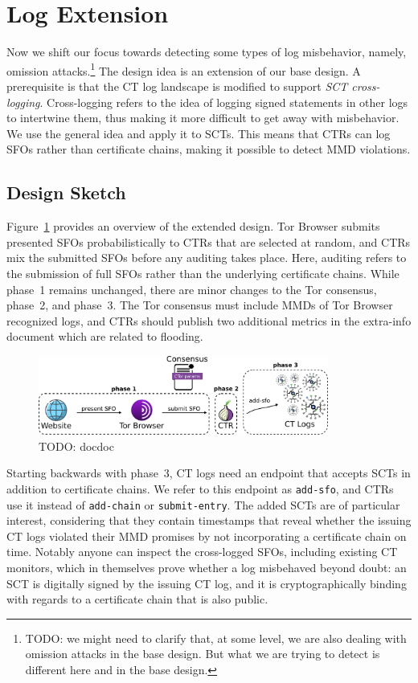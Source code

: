 \section{Log Extension} \label{sec:log}
Now we shift our focus towards detecting some types of log misbehavior, namely,
omission attacks.\footnote{%
	TODO: we might need to clarify that, at some level, we are also dealing with
	omission attacks in the base design.  But what we are trying to detect is
	different here and in the base design.
} The design idea is an
extension of our base design.  A prerequisite is that the CT log landscape
is modified to support \emph{SCT cross-logging}.  Cross-logging refers to the
idea of logging signed statements in other logs to intertwine
them, thus making it more difficult to get away with
misbehavior.  We use the general idea and apply it to SCTs.  This means that
CTRs can log SFOs rather than certificate chains, making it possible to detect
MMD violations.

\subsection{Design Sketch}
Figure~\ref{fig:ext-log} provides an overview of the extended design.  Tor
Browser submits presented SFOs probabilistically to CTRs that are selected
at random, and CTRs mix the submitted SFOs before any auditing takes place.
Here, auditing refers to the submission of full SFOs rather than the underlying
certificate chains.  While phase~1 remains unchanged, there are minor changes
to the Tor consensus, phase~2, and phase~3.  The Tor consensus must include MMDs
of Tor Browser recognized logs, and CTRs should publish two additional metrics
in the extra-info document which are related to flooding.

\begin{figure}
    \centering
    \includegraphics[width=0.85\textwidth]{img/design-log}
	\caption{TODO: docdoc}
    \label{fig:ext-log}
\end{figure}

Starting backwards with phase~3, CT logs need an endpoint that accepts SCTs in
addition to certificate chains.  We refer to this endpoint as
\texttt{add-sfo}, and CTRs use it instead of \texttt{add-chain} or
\texttt{submit-entry}.  The added SCTs are of particular interest,
considering that they contain timestamps that reveal whether the issuing CT logs
violated their MMD promises by not incorporating a certificate chain on time.
Notably anyone can inspect the cross-logged SFOs, including existing CT
monitors, which in themselves prove whether a log misbehaved beyond doubt:
	an SCT is digitally signed by the issuing CT log, and
	it is cryptographically binding with regards to a certificate chain that
		is also public.

